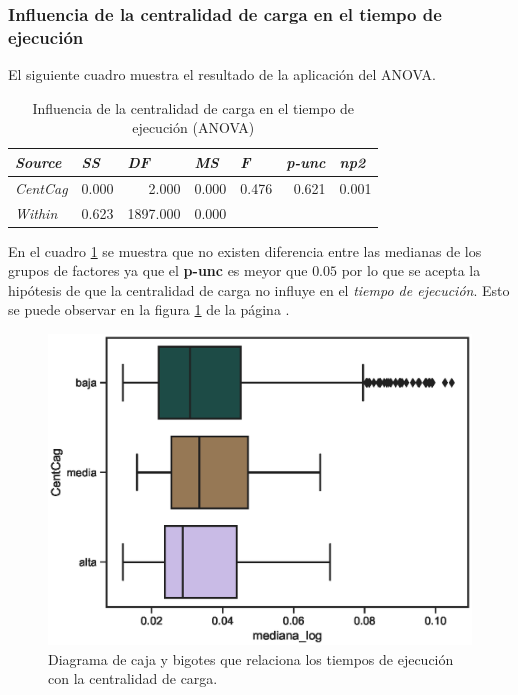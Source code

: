 \documentclass{article}
\begin{document}
\subsubsection{Influencia de la centralidad de carga en el tiempo de ejecución}

El siguiente cuadro muestra el resultado de la aplicación del ANOVA.

\begin{table}[htbp]
  \centering
  \caption{Influencia de la centralidad de carga en el tiempo de ejecución (ANOVA)}
    \begin{tabular}{lrrrrrr}
    \toprule
    \textit{\textbf{Source}} & \multicolumn{1}{l}{\textit{\textbf{SS}}} & \multicolumn{1}{l}{\textit{\textbf{DF}}} & \multicolumn{1}{l}{\textit{\textbf{MS}}} & \multicolumn{1}{l}{\textit{\textbf{F}}} & \multicolumn{1}{l}{\textit{\textbf{p-unc}}} & \multicolumn{1}{l}{\textit{\textbf{np2}}} \\
    \midrule
    \textit{CentCag} & 0.000 & 2.000 & 0.000 & 0.476 & 0.621 & 0.001 \\
    \textit{Within} & 0.623 & 1897.000 & 0.000 &       &       &  \\
    \bottomrule
    \end{tabular}%
  \label{tab:t9}%
\end{table}%

En el cuadro \ref{tab:t9} se muestra que no existen diferencia entre las medianas de los grupos de factores ya que el {\bf p-unc } es meyor que $0.05$ por lo que se acepta la hipótesis de que la centralidad de carga no influye en el \textit{tiempo de ejecución}. Esto se puede observar en la figura \ref{fig16} de la página \pageref{fig16}.

\begin{center}
\begin{figure}[htbp]
\includegraphics[scale=0.6]{boxplot_CentCag.eps}
\caption{Diagrama de caja y bigotes que relaciona los tiempos de ejecución con la centralidad de carga.}
\label{fig16}
\end{figure}
\end{center}
\end{document}
